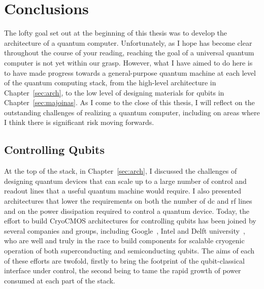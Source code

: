 \chapter{Conclusions}

The lofty goal set out at the beginning of this thesis was to develop the architecture of a quantum computer. Unfortunately,
as I hope has become clear throughout the course of your reading, reaching the goal of a universal quantum computer
is not yet within our grasp. However, what I have aimed to do here is to have made progress towards a general-purpose quantum machine at each
level of the quantum computing stack, from the high-level architecture in Chapter~\ref{sec:arch}, to the low level
of designing materials for qubits in Chapter~\ref{sec:majoinas}. As I come to the close of this thesis, I will reflect on the outstanding
challenges of realizing a quantum computer, including on areas where I think there is significant risk moving forwards.

\section{Controlling Qubits}
At the top of the stack, in Chapter~\ref{sec:arch}, I discussed the challenges of designing quantum devices that can scale up to a large number of
control and readout lines that a useful quantum machine would require. I also presented architectures that lower the
requirements on both the number of dc and rf lines and on the power dissipation required to control a quantum device. Today, the effort to build
CryoCMOS architectures for controlling qubits has been joined by several companies and groups, including Google~\cite{gcryocmos}, Intel and Delft university~\cite{VANDIJK201990},
who are well and truly in the race to build components for scalable cryogenic operation of both superconducting and semiconducting qubits. The aims of each
of these efforts are twofold, firstly to bring the footprint of the qubit-classical interface under control, the second being
to tame the rapid growth of power consumed at each part of the stack.


